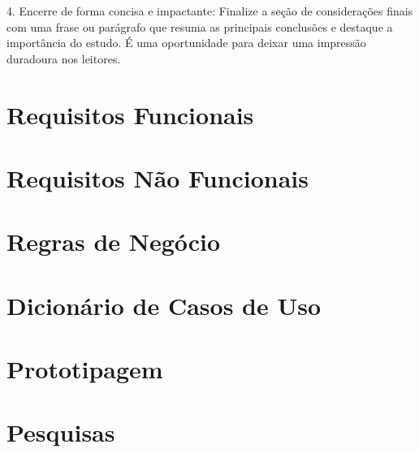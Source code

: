 \documentclass[
	article,			%
	12pt,				%
	oneside,			%
	a4paper,			%
    BIBLATEX,           %
	english,			%
	brazil,				%
	sumario=tradicional
	]{abntex2}
\begin{document}
4. Encerre de forma concisa e impactante: Finalize a seção de considerações finais com uma frase ou parágrafo que resuma as principais conclusões e destaque a importância do estudo. É uma oportunidade para deixar uma impressão duradoura nos leitores.

\postextual


%
%


\newpage
\begin{apendicesenv}

\chapter{Requisitos Funcionais}



\chapter{Requisitos Não Funcionais}



\chapter{Regras de Negócio}



\chapter{Dicionário de Casos de Uso\label{dicionario_casos_uso}}



\chapter{Prototipagem\label{prototipagem}}



\chapter{Pesquisas\label{pesquisas}}

\newpage



\end{apendicesenv}
\end{document}
